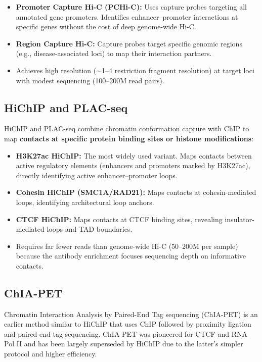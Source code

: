 \begin{itemize}[itemsep=2pt]
  \item \textbf{Promoter Capture Hi-C (PCHi-C):} Uses capture probes targeting all annotated gene promoters. Identifies enhancer--promoter interactions at specific genes without the cost of deep genome-wide Hi-C.
  \item \textbf{Region Capture Hi-C:} Capture probes target specific genomic regions (e.g., disease-associated loci) to map their interaction partners.
  \item Achieves high resolution ($\sim$1--4 restriction fragment resolution) at target loci with modest sequencing (100--200M read pairs).
\end{itemize}

\subsection{HiChIP and PLAC-seq}
\label{subsec:3dgenome:hichip}

HiChIP and PLAC-seq combine chromatin conformation capture with ChIP to map \textbf{contacts at specific protein binding sites or histone modifications}:

\begin{itemize}[itemsep=3pt]
  \item \textbf{H3K27ac HiChIP:} The most widely used variant. Maps contacts between active regulatory elements (enhancers and promoters marked by H3K27ac), directly identifying active enhancer--promoter loops.
  \item \textbf{Cohesin HiChIP (SMC1A/RAD21):} Maps contacts at cohesin-mediated loops, identifying architectural loop anchors.
  \item \textbf{CTCF HiChIP:} Maps contacts at CTCF binding sites, revealing insulator-mediated loops and TAD boundaries.
  \item Requires far fewer reads than genome-wide Hi-C (50--200M per sample) because the antibody enrichment focuses sequencing depth on informative contacts.
\end{itemize}

\subsection{ChIA-PET}
\label{subsec:3dgenome:chiapet}

Chromatin Interaction Analysis by Paired-End Tag sequencing (ChIA-PET) is an earlier method similar to HiChIP that uses ChIP followed by proximity ligation and paired-end tag sequencing. ChIA-PET was pioneered for CTCF and RNA Pol II and has been largely superseded by HiChIP due to the latter's simpler protocol and higher efficiency.

